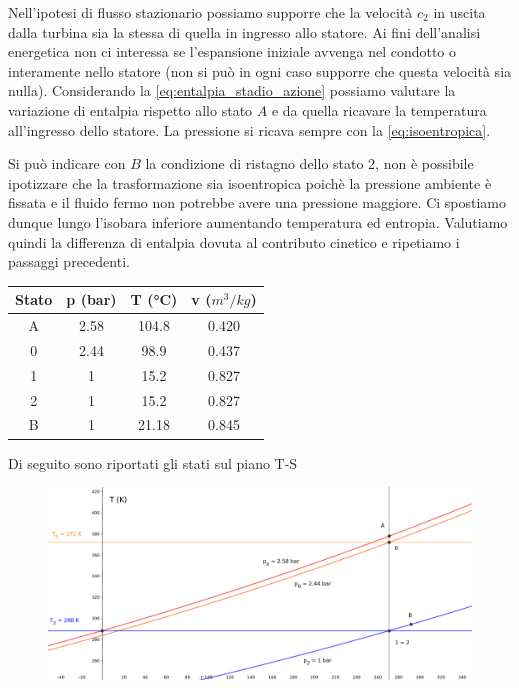 \documentclass[a4paper,12pt]{article}
\begin{document}
Nell'ipotesi di flusso stazionario possiamo supporre che la velocità $c_2$ in uscita dalla turbina sia la stessa di quella in ingresso allo statore.
Ai fini dell'analisi energetica non ci interessa se l'espansione iniziale avvenga nel condotto o interamente nello statore (non si può in ogni caso supporre che questa
velocità sia nulla).
Considerando la \eqref{eq:entalpia_stadio_azione} possiamo valutare la variazione di entalpia rispetto allo stato $A$ e da quella ricavare la temperatura all'ingresso
dello statore. La pressione si ricava sempre con la \eqref{eq:isoentropica}.

Si può indicare con $B$ la condizione di ristagno dello stato 2, non è possibile ipotizzare che la trasformazione sia isoentropica poichè la pressione ambiente è fissata
e il fluido fermo non potrebbe avere una pressione maggiore. Ci spostiamo dunque lungo l'isobara inferiore aumentando temperatura ed entropia.
Valutiamo quindi la differenza di entalpia dovuta al contributo cinetico e ripetiamo i passaggi precedenti.
\begin{center}
    \begin{tabular}{c|c|c|c}
        Stato   &p (bar)    &T (°C) &v ($m^3/kg$) \\ \hline
        A       &2.58       &104.8  &0.420  \\
        0       &2.44       &98.9   &0.437  \\
        1       &1          &15.2   &0.827  \\
        2       &1          &15.2   &0.827  \\
        B       &1          &21.18  &0.845
    \end{tabular}
\end{center}
Di seguito sono riportati gli stati sul piano T-S
\begin{figure}[H]
    \label{fig:trasformazioni_TS_azione}
    \centering
    \includegraphics[width=.90\linewidth]{media/trasformazioni_TS_azione.png}
\end{figure}
\end{document}
